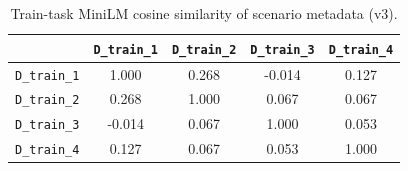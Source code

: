 \begin{table}[t]
\centering
\caption{Train-task MiniLM cosine similarity of scenario metadata (v3).}
\begin{tabular}{lcccc}
\toprule
 & \texttt{D_train_1} & \texttt{D_train_2} & \texttt{D_train_3} & \texttt{D_train_4} \\
\midrule
\texttt{D_train_1} & 1.000 & 0.268 & -0.014 & 0.127 \\
\texttt{D_train_2} & 0.268 & 1.000 & 0.067 & 0.067 \\
\texttt{D_train_3} & -0.014 & 0.067 & 1.000 & 0.053 \\
\texttt{D_train_4} & 0.127 & 0.067 & 0.053 & 1.000 \\
\bottomrule
\end{tabular}
\end{table}